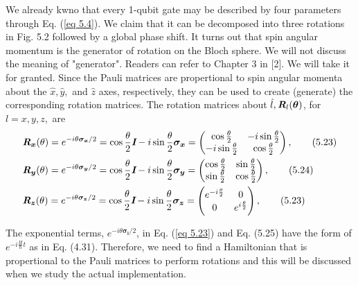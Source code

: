 \documentclass{article}
\newcommand{\bfit}[1]{\textit{\textbf{#1}}}
\begin{document}
We already kwno that every 1-qubit gate may be described by four parameters through
Eq. (\ref{eq 5.4}). We claim that it can be decomposed into three rotations in Fig. 5.2 followed by a global
phase shift. It turns out that spin angular momentum is the generator of rotation
on the Bloch sphere. We will not discuss the meaning of "generator". Readers can refer to 
Chapter 3 in [2]. We will take it for granted. Since the Pauli matrices are propertional to spin
angular momenta about the $\hat{x}, \hat{y},$ and $\hat{z}$ axes, respectively, they can be used to create
(generate) the corresponding rotation matrices. The rotation matrices about $\hat{l}, \bfit{R}_l(\boldsymbol{\theta})$, for $l=x, y, z,$ are
\begin{align}
    \label{eq 5.23}&\bfit{R}_{\boldsymbol{x}}(\theta)= e^{-i\theta\boldsymbol{\sigma_x}/2}=\cos{\frac{\theta}{2}}\bfit{I}-i\sin{\frac{\theta}{2}\boldsymbol{\sigma_x}}=\begin{pmatrix}
        \cos{\frac{\theta}{2}}&-i\sin{\frac{\theta}{2}}\\
        -i\sin{\frac{\theta}{2}}&\cos{\frac{\theta}{2}}
    \end{pmatrix},\tag{5.23}\\
   \label{eq 5.24} &\bfit{R}_{\boldsymbol{y}}(\theta)= e^{-i\theta\boldsymbol{\sigma_y}/2}=\cos{\frac{\theta}{2}}\bfit{I}-i\sin{\frac{\theta}{2}\boldsymbol{\sigma_y}}=\begin{pmatrix}
        \cos{\frac{\theta}{2}}&\sin{\frac{\theta}{2}}\\
        \sin{\frac{\theta}{2}}&\cos{\frac{\theta}{2}}
    \end{pmatrix},\tag{5.24}\\ 
    \label{eq 5.25}&\bfit{R}_{\boldsymbol{z}}(\theta)= e^{-i\theta\boldsymbol{\sigma_z}/2}=\cos{\frac{\theta}{2}}\bfit{I}-i\sin{\frac{\theta}{2}\boldsymbol{\sigma_z}}=\begin{pmatrix}
        e^{-i\frac{\theta}{2}}&0\\
       0&e^{i\frac{\theta}{2}}
    \end{pmatrix},\tag{5.23}
\end{align}

The exponential terms, $e^{-i\theta\boldsymbol{\sigma_l}/2}$, in Eq. (\ref{eq 5.23}) and Eq. (5.25) have
the form of $e^{-i\frac{H}{\hbar}t}$ as in Eq. (4.31). Therefore, we need to find a Hamiltonian that is propertional to
the Pauli matrices to perform rotations and this will be discussed when we study the actual implementation.
\end{document}
